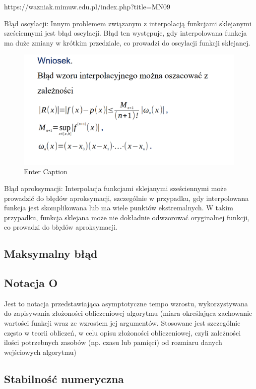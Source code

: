 \documentclass{article}
\begin{document}
https://wazniak.mimuw.edu.pl/index.php?title=MN09

Błąd oscylacji: Innym problemem związanym z interpolacją funkcjami sklejanymi sześciennymi jest błąd oscylacji. Błąd ten występuje, gdy interpolowana funkcja ma duże zmiany w krótkim przedziale, co prowadzi do oscylacji funkcji sklejanej.
\begin{figure}
    \centering
    \includegraphics[width=0.5\linewidth]{image.png}
    \caption{Enter Caption}
    \label{fig:enter-label}
\end{figure}

Błąd aproksymacji: Interpolacja funkcjami sklejanymi sześciennymi może prowadzić do błędów aproksymacji, szczególnie w przypadku, gdy interpolowana funkcja jest skomplikowana lub ma wiele punktów ekstremalnych. W takim przypadku, funkcja sklejana może nie dokładnie odwzorować oryginalnej funkcji, co prowadzi do błędów aproksymacji.
\subsection{Maksymalny błąd}
\subsection{Notacja O}

Jest to notacja przedstawiająca asymptotyczne tempo wzrostu, wykorzystywana do zapisywania złożoności obliczeniowej algorytmu (miara określająca zachowanie wartości funkcji wraz ze wzrostem jej argumentów. Stosowane jest szczególnie często w teorii obliczeń, w celu opisu złożoności obliczeniowej, czyli zależności ilości potrzebnych zasobów (np. czasu lub pamięci) od rozmiaru danych wejściowych algorytmu) 


\subsection{Stabilność numeryczna}
\end{document}
